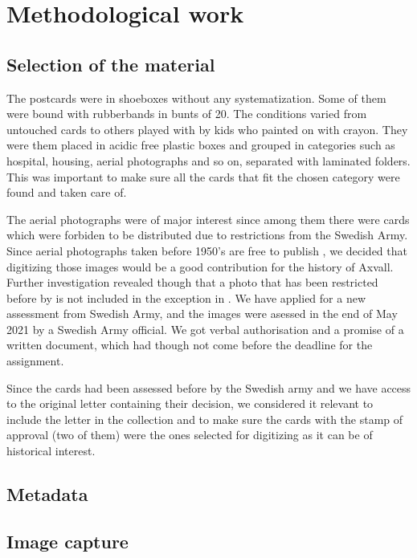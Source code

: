 \documentclass[12 pt]{paper}
\begin{document}
\section{Methodological work}%
\subsection{Selection of the material}

The postcards were in shoeboxes without any systematization. Some of them were bound with rubberbands in bunts of 20. The conditions varied from untouched cards to others played with by kids who painted on with crayon. They were them placed in acidic free plastic boxes and grouped in categories such as hospital, housing, aerial photographs and so on, separated with laminated folders. This was important to make sure all the cards that fit the chosen category were found and taken care of.
 
The aerial photographs were of major interest since among them there were cards  which were forbiden to be distributed due to restrictions from the Swedish Army. Since aerial photographs taken before 1950's are free to publish \autocite[][kap. 3, 3§]{lantm2018}, we decided that digitizing those images would be a good contribution for the history of Axvall. Further investigation revealed though that a photo that has been restricted before by is not included in the exception in \textcite{lantm2018}. We have applied for a new assessment from Swedish Army, and the images were asessed in the end of May 2021 by a Swedish Army official. We got verbal authorisation and a promise of a written document, which had though not come before the deadline for the assignment. 

Since the cards had been assessed before by the Swedish army and we have access to the original letter containing their decision, we considered it relevant to include the letter in the collection and to make sure the cards with the stamp of approval (two of them) were the ones selected for digitizing as it can be of historical interest. 
\subsection{Metadata}

\subsection{Image capture}
\end{document}
